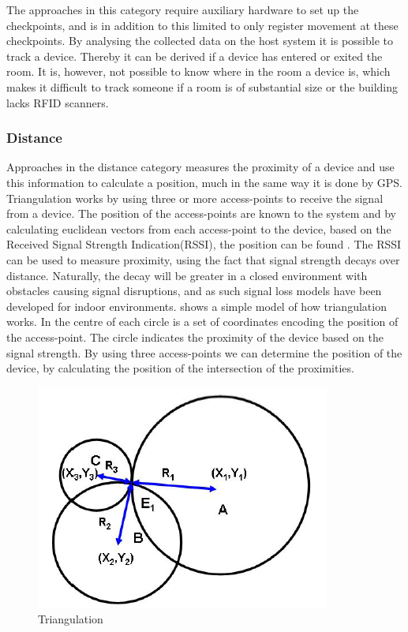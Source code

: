 The approaches in this category require auxiliary hardware to set up the checkpoints, and is in addition to this limited to only register movement at these checkpoints. By analysing the collected data on the host system it is possible to track a device. Thereby it can be derived if a device has entered or exited the room. It is, however, not possible to know where in the room a device is, which makes it difficult to track someone if a room is of substantial size or the building lacks RFID scanners\cite{RFIDjournal}.

\subsubsection*{Distance}
Approaches in the distance category measures the proximity of a device and use this information to calculate a position, much in the same way it is done by GPS.
Triangulation works by using three or more access-points to receive the signal from a device. The position of the access-points are known to the system and by calculating euclidean vectors from each access-point to the device, based on the Received Signal Strength Indication(RSSI), the position can be found \cite{Triangulation}. The RSSI can be used to measure proximity, using the fact that signal strength decays over distance. Naturally, the decay will be greater in a closed environment with obstacles causing signal disruptions, and as such signal loss models have been developed for indoor environments. 
 shows a simple model of how triangulation works. In the centre of each circle is a set of coordinates encoding the position of the access-point. The circle indicates the proximity of the device based on the signal strength. By using three access-points we can determine the position of the device, by calculating the position of the intersection of the proximities.
\begin{figure}[ht]
	\begin{center}
		\includegraphics[scale=1]{graphics/triangulation.png}
		\caption{Triangulation\cite{Triangulation}}
		\label{fig:triangulation}
	\end{center}
\end{figure}

